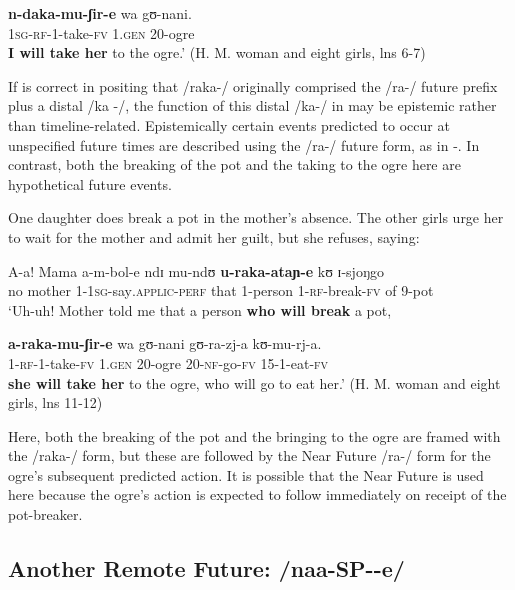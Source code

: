 \documentclass[output=paper]{langsci/langscibook}
\begin{document}
\gll \textbf{n-daka-mu-ʃir-e}   wa   gʊ-nani. \\
\textsc{1sg-rf-}1-take-\textsc{fv}  1.\textsc{gen}  20-ogre \\
\glt \textbf{I will take her} to the ogre.’ (H. M. woman and eight girls, lns 6-7)
\z

If \citet{Botne1999} is correct in positing that /raka-/ originally comprised the /ra-/ future prefix plus a distal /ka%
%
-/, the function of this distal /ka-/ in  may be epistemic rather than timeline-related. Epistemically certain events predicted to occur at unspecified future times are described using the /ra-/ future form, as in -. In contrast, both the breaking of the pot and the taking to the ogre here are hypothetical future events. 

One daughter does break a pot in the mother’s absence. The other girls urge her to wait for the mother and admit her guilt, but she refuses, saying:

\ea\label{ex:sarvasy:15}
\gll A-a!  Mama    a-m-bol-e      ndɪ   mu-ndʊ   \textbf{u-raka-ataɲ-e}   kʊ   ɪ-sjoŋgo  \\
no  mother  1-1\textsc{sg}-say\textsc{.applic-perf}  that  1-person  1\textsc{-rf}-break-\textsc{fv}  of  9-pot\\
\glt `Uh-uh! Mother told me that a person \textbf{who will break} a pot,

\gll \textbf{a-raka-mu-ʃir-e}   wa   gʊ-nani  gʊ-ra-zj-a  kʊ-mu-rj-a.\\
1\textsc{-rf-}1-take-\textsc{fv}    1.\textsc{gen}  20-ogre  20-\textsc{nf}-go-\textsc{fv}  15-1-eat-\textsc{fv} \\
\glt \textbf{she will take her} to the ogre, who will go to eat her.' (H. M. woman and eight girls, lns 11-12)
\z

Here, both the breaking of the pot and the bringing to the ogre are framed with the /raka-/ form, but these are followed by the Near Future /ra-/ form for the ogre’s subsequent predicted action. It is possible that the Near Future is used here because the ogre’s action is expected to follow immediately on receipt of the pot-breaker.

\subsection{Another Remote Future: /naa-SP-{\longrule}-e/}\label{sec:sarvasy:6.2}
\end{document}
